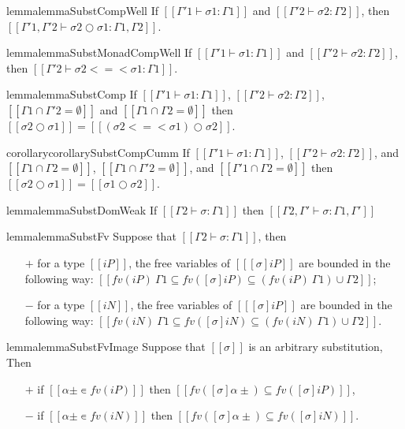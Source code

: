 \begin{restatable}{lemma}{lemmaSubstCompWell}
    \label{lemma:subst-comp-well}
    If $[[Γ'1 ⊢ σ1 : Γ1]]$ and $[[Γ'2 ⊢ σ2 : Γ2]]$,
    then $[[Γ'1, Γ'2 ⊢ σ2 ○ σ1 : Γ1, Γ2]]$.
\end{restatable}


\begin{restatable}{lemma}{lemmaSubstMonadCompWell}
    \label{lemma:subst-monad-composition-wf}
    If $[[Γ'1 ⊢ σ1 : Γ1]]$ and $[[Γ'2 ⊢ σ2 : Γ2]]$,
    then $[[Γ'2 ⊢ σ2 <=< σ1 : Γ1]]$.
\end{restatable}


\begin{restatable}{lemma}{lemmaSubstComp}
    \label{lemma:subst-composition}
        If $[[Γ'1 ⊢ σ1 : Γ1]]$, $[[Γ'2 ⊢ σ2 : Γ2]]$, 
        $[[Γ1 ∩ Γ'2 = ∅ ]]$ and $[[ Γ1 ∩ Γ2 = ∅ ]]$ then 
        $[[ σ2 ○ σ1 ]] = [[ (σ2 <=< σ1) ○ σ2 ]]$.
\end{restatable}


\begin{restatable}{corollary}{corollarySubstCompCumm}
    \label{corollary:subst-composition-commutativity}
    If $[[Γ'1 ⊢ σ1 : Γ1]]$, $[[Γ'2 ⊢ σ2 : Γ2]]$, and
    $[[ Γ1 ∩ Γ2 = ∅ ]]$, 
    $[[ Γ1 ∩ Γ'2 = ∅ ]]$, and
    $[[ Γ'1 ∩ Γ2 = ∅ ]]$ then 
    $[[ σ2 ○ σ1 ]] = [[ σ1 ○ σ2 ]]$.
\end{restatable}


\begin{restatable}{lemma}{lemmaSubstDomWeak}
    \label{lemma:subst-domain-weakening}
    If $[[Γ2 ⊢ σ : Γ1]]$ then $[[Γ2, Γ' ⊢ σ : Γ1, Γ']]$
\end{restatable}


\begin{restatable}{lemma}{lemmaSubstFv}
    \label{lemma:subst-fv}
    Suppose that $[[Γ2 ⊢ σ : Γ1]]$, then
    \begin{enumerate}
        \item [$+$] for a type $[[iP]]$,
            the free variables of $[[ [σ]iP ]]$ are bounded in the following way:
         $[[fv(iP) \ Γ1 ⊆ fv([σ]iP) ⊆ (fv(iP) \ Γ1) ∪ Γ2]]$;
        \item [$-$] for a type $[[iN]]$, 
            the free variables of $[[ [σ]iP ]]$ are bounded in the following way:
            $[[fv(iN) \ Γ1 ⊆ fv([σ]iN) ⊆ (fv(iN) \ Γ1) ∪ Γ2]]$.
    \end{enumerate}
\end{restatable}


\begin{restatable}{lemma}{lemmaSubstFvImage}
    \label{lemma:subst-fv-image}
    Suppose that $[[σ]]$ is an arbitrary substitution, 
    Then 
    \begin{itemize}
        \item [$+$] if $[[α± ∊ fv(iP)]]$ then $[[ fv([σ]α±) ⊆ fv([σ]iP) ]]$,
        \item [$-$] if $[[α± ∊ fv(iN)]]$ then $[[ fv([σ]α±) ⊆ fv([σ]iN) ]]$.
    \end{itemize}
\end{restatable}
